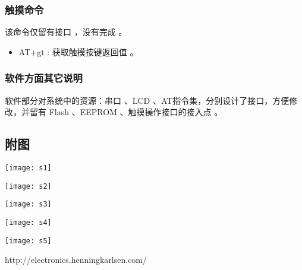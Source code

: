 \documentclass{article}
\begin{document}
\subsubsection{触摸命令}
\label{sec:触摸命令}

该命令仅留有接口 ，没有完成 。
\begin{itemize}
\item AT+gt : 获取触摸按键返回值 。
\end{itemize}

\subsubsection{软件方面其它说明}
\label{sec:软件方面其它说明}

软件部分对系统中的资源：串口 、LCD 、AT指令集，分别设计了接口，方便修改，并留有 Flash 、EEPROM 、触摸操作接口的接入点 。

\subsection{附图}
\label{sec:附图}
\begin{center}
  \texttt{[image: s1]}
\end{center}
\begin{center}
  \texttt{[image: s2]}
\end{center}
\begin{center}
  \texttt{[image: s3]}
\end{center}
\begin{center}
  \texttt{[image: s4]}
\end{center}
\begin{center}
  \texttt{[image: s5]}
\end{center}

\begin{thebibliography}{10}
  http://electronics.henningkarlsen.com/
\end{thebibliography}
\end{document}

